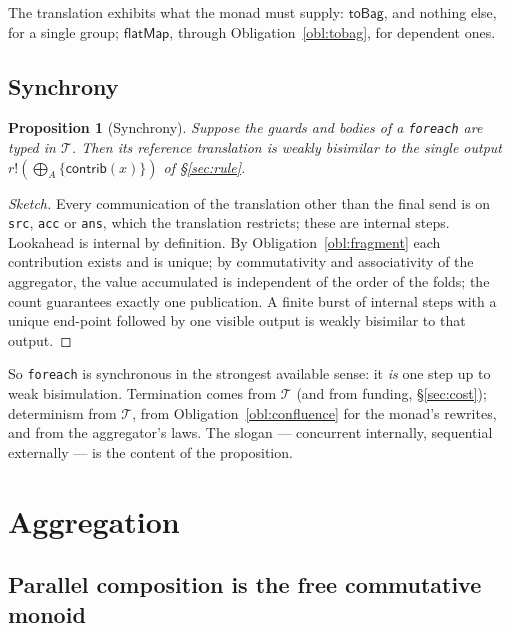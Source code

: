 \documentclass[11pt]{article}
\theoremstyle{definition}
\theoremstyle{plain}
\newtheorem{proposition}[definition]{Proposition}
\theoremstyle{remark}
\newcommand{\bind}{\mathsf{flatMap}}
\newcommand{\fe}{\texttt{foreach}}
\begin{document}
The translation exhibits what the monad must supply: \(\mathsf{toBag}\), and
nothing else, for a single group; \(\bind\), through Obligation~\ref{obl:tobag},
for dependent ones.

\subsection{Synchrony}
\label{sec:sync}

\begin{proposition}[Synchrony]
\label{prop:sync}
Suppose the guards and bodies of a \fe{} are typed in \(\mathcal{T}\). Then its
reference translation is weakly bisimilar to the single output
\(r!(\bigoplus_A\{\mathsf{contrib}(x)\})\) of \S\ref{sec:rule}.
\end{proposition}

\begin{proof}[Sketch]
Every communication of the translation other than the final send is on
\texttt{src}, \texttt{acc} or \texttt{ans}, which the translation restricts;
these are internal steps. Lookahead is internal by definition. By
Obligation~\ref{obl:fragment} each contribution exists and is unique; by
commutativity and associativity of the aggregator, the value accumulated is
independent of the order of the folds; the count guarantees exactly one
publication. A finite burst of internal steps with a unique end-point followed
by one visible output is weakly bisimilar to that output.
\end{proof}

So \fe{} is synchronous in the strongest available sense: it \emph{is} one step
up to weak bisimulation. Termination comes from \(\mathcal{T}\) (and from
funding, \S\ref{sec:cost}); determinism from \(\mathcal{T}\), from
Obligation~\ref{obl:confluence} for the monad's rewrites, and from the
aggregator's laws. The slogan --- concurrent internally, sequential externally
--- is the content of the proposition.

\section{Aggregation}
\label{sec:agg}

\subsection{Parallel composition is the free commutative monoid}
\label{sec:free}
\end{document}
